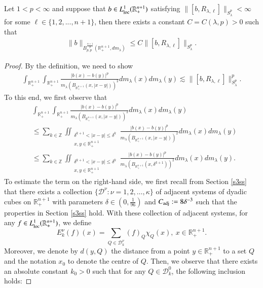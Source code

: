 \documentclass[12pt]{amsart}
\begin{document}
\begin{proposition}\label{schattenlarge1}
Let $1<p<\infty$ and suppose that $b\in L_{\rm loc}^1(\mathbb{R}_{+}^{n+1})$  satisfying $\|[b,R_{\lambda,\ell}]\|_{S_\lambda^p}<\infty$ for some $\ell\in\{1,2,...,n+1\}$, then there exists a constant $C=C(\lambda,p)>0$ such that
\begin{align*}
\|b\|_{B_{p,p}^{\frac{n+1}{p}}(\mathbb{R}_+^{n+1},dm_\lambda)}\leq C\|[b,R_{\lambda,\ell}]\|_{S_\lambda^p}.
\end{align*}
\end{proposition}
\begin{proof}
By the definition, we need to show
\begin{align}\label{justify}
\int_{\mathbb{R}_{+}^{n+1}}\int_{\mathbb{R}_{+}^{n+1}}\frac{|b(x)-b(y)|^{p}}{m_\lambda(B_{\mathbb{R}_+^{n+1}}(x,|x-y|))^{2}}dm_\lambda(x)dm_\lambda(y)\lesssim \|[b,R_{\lambda,\ell}]\|_{S_\lambda^{p}}^p.
\end{align}
To this end, we first observe that
\begin{align*}
&\int_{\mathbb{R}_{+}^{n+1}}\int_{\mathbb{R}_{+}^{n+1}}\frac{|b(x)-b(y)|^{p}}{m_\lambda(B_{\mathbb{R}_+^{n+1}}(x,|x-y|))^{2}}dm_\lambda(x)dm_\lambda(y)\\
&\leq \sum_{k\in\mathbb{Z}}\iint_{\substack{\delta^{k+1}<|x-y|\leq \delta^{k}\\x,y\in\mathbb{R}_{+}^{n+1}}}\frac{|b(x)-b(y)|^{p}}{m_\lambda(B_{\mathbb{R}_+^{n+1}}(x,|x-y|))^{2}}dm_\lambda(x)dm_\lambda(y)\\
&\leq \sum_{k\in\mathbb{Z}}\iint_{\substack{\delta^{k+1}<|x-y|\leq \delta^{k}\\x,y\in\mathbb{R}_{+}^{n+1}}}\frac{|b(x)-b(y)|^{p}}{m_\lambda(B_{\mathbb{R}_+^{n+1}}(x,\delta^{k+1}))^{2}}dm_\lambda(x)dm_\lambda(y).
\end{align*}
To estimate the term on the right-hand side,  we first recall from Section \ref{s3ss} that there exists a collection $\{\mathcal{D}^\nu\colon
    \nu = 1,2,\ldots ,\kappa\}$ of adjacent systems of dyadic cubes on $\mathbb{R}^{n+1}_+$ with
    parameters $\delta\in (0, \frac{1}{96}) $ and $C_{\rm adj} := 8\delta^{-3}$ such that the properties in Section \ref{s3ss} hold. With these collection of adjacent systems, for any $f\in  L_{\rm loc}^1(\mathbb{R}_+^{n+1})$, we define
     $$E_{k}^\nu(f)(x)=\sum_{Q\in \mathcal{D}_{k}^\nu}(f)_{Q}\chi_{Q}(x),\ x\in\mathbb{R}_+^{n+1}.$$
Moreover, we denote by $d(y,Q)$ the distance from a point $y\in\mathbb{R}_+^{n+1}$ to a set $Q$ and the notation $x_0$ to denote the centre of $Q$. Then, we observe that there exists an absolute constant $k_0>0$ such that for any $Q\in \mathcal{D}_{k}^{0}$, the following inclusion holds:

\end{proof}
\end{document}
